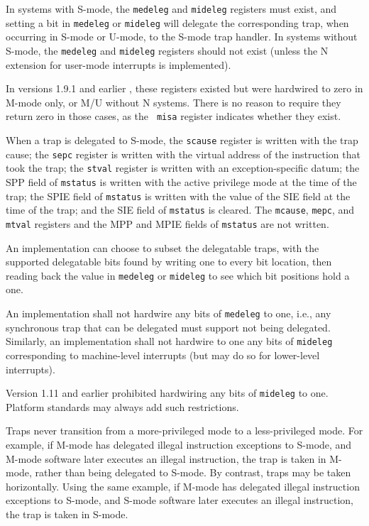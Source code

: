 In systems with S-mode, the {\tt medeleg} and {\tt mideleg} registers
must exist, and setting a bit in
{\tt medeleg} or {\tt mideleg} will delegate the corresponding trap, when
occurring in S-mode or U-mode, to the S-mode trap handler.
In systems without S-mode, the {\tt medeleg} and {\tt mideleg} registers
should not exist (unless the N extension for user-mode interrupts is
implemented).

\begin{commentary}
  In versions 1.9.1 and earlier , these registers existed but were
  hardwired to zero in M-mode only, or M/U without N systems.  There
  is no reason to require they return zero in those cases, as the {\tt
    misa} register indicates whether they exist.
\end{commentary}


When a trap is delegated to S-mode, the
{\tt scause} register is written with the trap cause; the
{\tt sepc} register is written with the virtual address of
the instruction that took the trap; the
{\tt stval} register is written with an
exception-specific datum; the SPP field
of {\tt mstatus} is written with the active privilege mode at the time of
the trap; the SPIE field of {\tt mstatus} is written with the
value of the SIE field at the time of the trap; and
the SIE field of {\tt mstatus} is cleared.
The {\tt mcause}, {\tt mepc}, and {\tt mtval} registers and the MPP and
MPIE fields of {\tt mstatus} are not written.

An
implementation can choose to subset the delegatable traps, with the
supported delegatable bits found by writing one to every bit location,
then reading back the value in {\tt medeleg} or {\tt mideleg} to see
which bit positions hold a one.

An implementation shall not hardwire any bits of {\tt medeleg} to one, i.e.,
any synchronous trap that can be delegated must support not being delegated.
Similarly, an implementation shall not hardwire to one any bits of
{\tt mideleg} corresponding to machine-level interrupts (but may do so
for lower-level interrupts).

\begin{commentary}
Version 1.11 and earlier prohibited hardwiring any bits of {\tt mideleg}
to one.
Platform standards may always add such restrictions.
\end{commentary}

Traps never transition from a more-privileged mode to a less-privileged mode.
For example, if M-mode has delegated illegal instruction exceptions to S-mode, and
M-mode software later executes an illegal instruction, the trap is taken in
M-mode, rather than being delegated to S-mode.  By contrast, traps may be
taken horizontally.  Using the same example, if M-mode has delegated illegal
instruction exceptions to S-mode, and S-mode software later executes an illegal
instruction, the trap is taken in S-mode.

